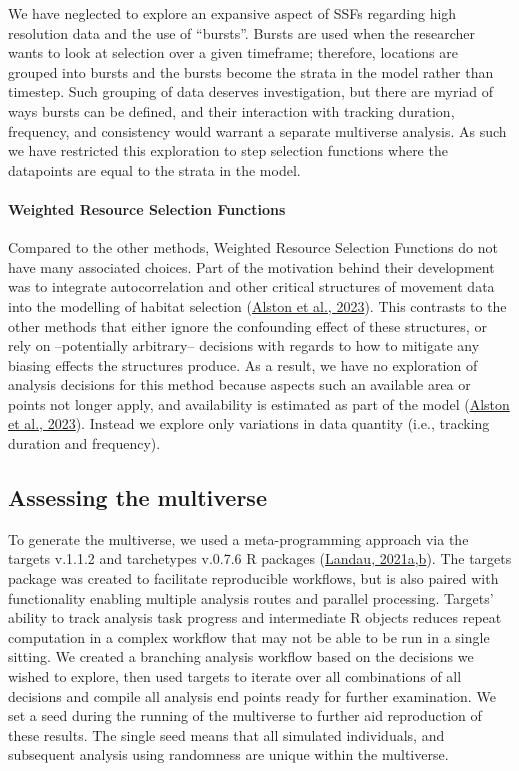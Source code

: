 \documentclass[10pt,a4paper]{article}
\begin{document}
We have neglected to explore an expansive aspect of SSFs regarding high resolution data and the use of ``bursts''.
Bursts are used when the researcher wants to look at selection over a given timeframe; therefore, locations are grouped into bursts and the bursts become the strata in the model rather than timestep.
Such grouping of data deserves investigation, but there are myriad of ways bursts can be defined, and their interaction with tracking duration, frequency, and consistency would warrant a separate multiverse analysis.
As such we have restricted this exploration to step selection functions where the datapoints are equal to the strata in the model.

\hypertarget{weighted-resource-selection-functions}{%
\paragraph{Weighted Resource Selection Functions}\label{weighted-resource-selection-functions}}

Compared to the other methods, Weighted Resource Selection Functions do not have many associated choices.
Part of the motivation behind their development was to integrate autocorrelation and other critical structures of movement data into the modelling of habitat selection (\protect\hyperlink{ref-alston_mitigating_2023}{Alston et al., 2023}).
This contrasts to the other methods that either ignore the confounding effect of these structures, or rely on --potentially arbitrary-- decisions with regards to how to mitigate any biasing effects the structures produce.
As a result, we have no exploration of analysis decisions for this method because aspects such an available area or points not longer apply, and availability is estimated as part of the model (\protect\hyperlink{ref-alston_mitigating_2023}{Alston et al., 2023}).
Instead we explore only variations in data quantity (i.e., tracking duration and frequency).

\hypertarget{assessing-the-multiverse}{%
\subsection{Assessing the multiverse}\label{assessing-the-multiverse}}

To generate the multiverse, we used a meta-programming approach via the targets v.1.1.2 and tarchetypes v.0.7.6 R packages (\protect\hyperlink{ref-targets}{Landau, 2021a},\protect\hyperlink{ref-tarchetypes}{b}).
The targets package was created to facilitate reproducible workflows, but is also paired with functionality enabling multiple analysis routes and parallel processing.
Targets' ability to track analysis task progress and intermediate R objects reduces repeat computation in a complex workflow that may not be able to be run in a single sitting.
We created a branching analysis workflow based on the decisions we wished to explore, then used targets to iterate over all combinations of all decisions and compile all analysis end points ready for further examination.
We set a seed during the running of the multiverse to further aid reproduction of these results.
The single seed means that all simulated individuals, and subsequent analysis using randomness are unique within the multiverse.
\end{document}
